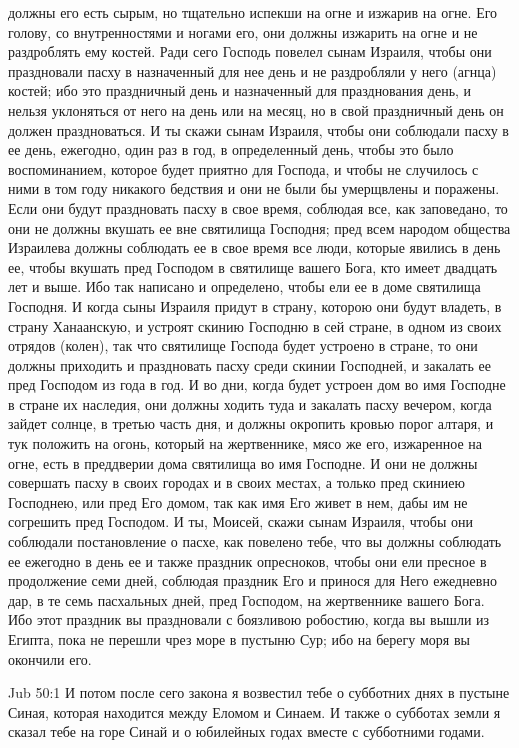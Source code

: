 должны его есть сырым, но тщательно испекши на
огне и изжарив на огне. Его голову, со
внутренностями и ногами его, они должны изжарить
на огне и не раздроблять ему костей. Ради сего
Господь повелел сынам Израиля, чтобы они
праздновали пасху в назначенный для нее день и не
раздробляли у него (агнца) костей; ибо это
праздничный день и назначенный для празднования
день, и нельзя уклоняться от него на день или на
месяц, но в свой праздничный день он должен
праздноваться. И ты скажи сынам Израиля, чтобы
они соблюдали пасху в ее день, ежегодно, один раз
в год, в определенный день, чтобы это было
воспоминанием, которое будет приятно для
Господа, и чтобы не случилось с ними в том году
никакого бедствия и они не были бы умерщвлены и
поражены. Если они будут праздновать пасху в свое
время, соблюдая все, как заповедано, то они не
должны вкушать ее вне святилища Господня; пред
всем народом общества Израилева должны
соблюдать ее в свое время все люди, которые
явились в день ее, чтобы вкушать пред Господом в
святилище вашего Бога, кто имеет двадцать лет и
выше. Ибо так написано и определено, чтобы ели ее
в доме святилища Господня. И когда сыны Израиля
придут в страну, которою они будут владеть, в
страну Ханаанскую, и устроят скинию Господню в
сей стране, в одном из своих отрядов (колен), так
что святилище Господа будет устроено в стране, то
они должны приходить и праздновать пасху среди
скинии Господней, и закалать ее пред Господом из
года в год. И во дни, когда будет устроен дом во
имя Господне в стране их наследия, они должны
ходить туда и закалать пасху вечером, когда
зайдет солнце, в третью часть дня, и должны
окропить кровью порог алтаря, и тук положить на
огонь, который на жертвеннике, мясо же его,
изжаренное на огне, есть в преддверии дома
святилища во имя Господне. И они не должны
совершать пасху в своих городах и в своих местах,
а только пред скиниею Господнею, или пред Его
домом, так как имя Его живет в нем, дабы им не
согрешить пред Господом. И ты, Моисей, скажи сынам
Израиля, чтобы они соблюдали постановление о
пасхе, как повелено тебе, что вы должны соблюдать
ее ежегодно в день ее и также праздник
опресноков, чтобы они ели пресное в продолжение
семи дней, соблюдая праздник Его и принося для
Него ежедневно дар, в те семь пасхальных дней,
пред Господом, на жертвеннике вашего Бога. Ибо
этот праздник вы праздновали с боязливою
робостию, когда вы вышли из Египта, пока не
перешли чрез море в пустыню Сур; ибо на берегу
моря вы окончили его.

\vs Jub 50:1
И потом после сего закона я возвестил тебе о
субботних днях в пустыне Синая, которая
находится между Еломом и Синаем. И также о
субботах земли я сказал тебе на горе Синай и о
юбилейных годах вместе с субботними годами.

